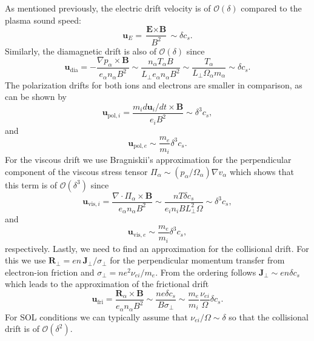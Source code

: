As mentioned previously, the electric drift velocity is of $\mathcal{O}(\delta)$ compared to the plasma sound speed:
\begin{equation}
	\textbf{u}_E = \frac{\textbf{E}\times\textbf{B}}{B^2} \sim \delta c_s.
\end{equation}
Similarly, the diamagnetic drift is also of $\mathcal{O}(\delta)$ since
\begin{equation}
	\textbf{u}_{\mathrm{dia}} = -\frac{\nabla p_\alpha \times \textbf{B}}{e_\alpha n_\alpha B^2} \sim \frac{n_\alpha T_\alpha B}{L_\perp e_\alpha n_\alpha B^2} \sim \frac{T_\alpha}{L_\perp \Omega_\alpha m_\alpha} \sim \delta c_s.
\end{equation}
The polarization drifts for both ions and electrons are smaller in comparison, as can be shown by
\begin{equation}
	\textbf{u}_{\mathrm{pol},i} = \frac{m_i d \textbf{u}_i/d t \times \textbf{B}}{e_i B^2}  \sim \delta^3 c_s,
\end{equation}
and
\begin{equation}
	\textbf{u}_{\mathrm{pol},e} \sim \frac{m_e}{m_i} \delta^3 c_s.
\end{equation}
For the viscous drift we use Bragniskii's approximation for the perpendicular component of the viscous stress tensor $\Pi_\alpha \sim (p_\alpha/\Omega_\alpha) \nabla v_{\alpha}$ which shows that this term is of $\mathcal{O}(\delta^3)$ since
\begin{equation}
	\textbf{u}_{\mathrm{vis},i} = \frac{\nabla \cdot \Pi_\alpha\times\textbf{B}}{e_\alpha n_\alpha B^2} \sim \frac{nT \delta c_s}{e_i n_i B L_\perp^2 \Omega} \sim \delta^3 c_s,
\end{equation}
and
\begin{equation}
	\textbf{u}_{\mathrm{vis},e} \sim \frac{m_e}{m_i}\delta^3  c_s,
\end{equation}
respectively. Lastly, we need to find an approximation for the collisional drift. For this we use $\textbf{R}_\perp = e n\,\textbf{J}_\perp/\sigma_\perp$ for the perpendicular momentum transfer from electron-ion friction and $\sigma_\perp = ne^2\nu_{ei}/m_e$. From the ordering follows $\textbf{J}_\perp \sim en\delta c_s$ which leads to the approximation of the frictional drift 
\begin{equation}\label{diffusion}
	\textbf{u}_{\mathrm{fri}} =\frac{\textbf{R}_\alpha \times \textbf{B}}{e_\alpha n_\alpha B^2} \sim \frac{ne\delta c_s}{B \sigma_\perp} \sim \frac{m_e}{m_i}\frac{\nu_{ei}}{\Omega}\delta c_s.
\end{equation}
For SOL conditions we can typically assume that $\nu_{ei}/\Omega\sim \delta$ so that the collisional drift is of  $\mathcal{O}(\delta^2)$. 

